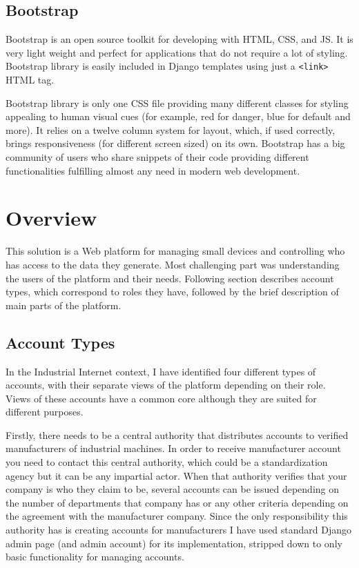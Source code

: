 \subsection{Bootstrap}

Bootstrap is an open source toolkit for developing with HTML, CSS, and JS. It is very light weight and perfect for applications that do not require a lot of styling. Bootstrap library is easily included in Django templates using just a \verb!<link>! HTML tag.

Bootstrap library is only one CSS file providing many different classes for styling appealing to human visual cues (for example, red for danger, blue for default and more). It relies on a twelve column system for layout, which, if used correctly, brings responsiveness (for different screen sized) on its own. Bootstrap has a big community of users who share snippets of their code providing different functionalities fulfilling almost any need in modern web development.

\section{Overview}

This solution is a Web platform for managing small devices and controlling who has access to the data they generate. Most challenging part was understanding the users of the platform and their needs. Following section describes account types, which correspond to roles they have, followed by the brief description of main parts of the platform.

\subsection{Account Types}

In the Industrial Internet context, I have identified four different types of accounts, with their separate views of the platform depending on their role. Views of these accounts have a common core although they are suited for different purposes. 

Firstly, there needs to be a central authority that distributes accounts to verified manufacturers of industrial machines. In order to receive manufacturer account you need to contact this central authority, which could be a standardization agency but it can be any impartial actor. When that authority verifies that your company is who they claim to be, several accounts can be issued depending on the number of departments that company has or any other criteria depending on the agreement with the manufacturer company. Since the only responsibility this authority has is creating accounts for manufacturers I have used standard Django admin page (and admin account) for its implementation, stripped down to only basic functionality for managing accounts.

